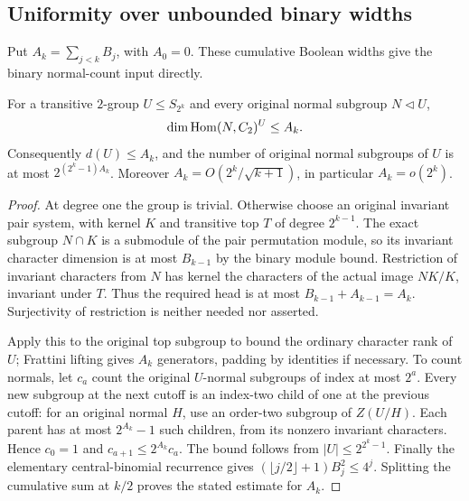 \subsection{Uniformity over unbounded binary widths}
Put $A_k=\sum_{j<k}B_j$, with $A_0=0$. These cumulative Boolean
widths give the binary normal-count input directly.
\begin{lemma}\label{lem:binary-normal-heads}
For a transitive $2$-group $U\leq S_{2^k}$ and every original
normal subgroup $N\lhd U$,
\[
 \dim\operatorname{Hom}(N,C_2)^U\leq A_k.
\]
Consequently $d(U)\leq A_k$, and the number of original normal
subgroups of $U$ is at most $2^{(2^k-1)A_k}$.
Moreover $A_k=O(2^k/\sqrt{k+1})$, in particular $A_k=o(2^k)$.
\end{lemma}
\begin{proof}
At degree one the group is trivial. Otherwise choose an original
invariant pair system, with kernel $K$ and transitive top $T$ of
degree $2^{k-1}$. The exact subgroup $N\cap K$ is a submodule of
the pair permutation module, so its invariant character dimension
is at most $B_{k-1}$ by the binary module bound. Restriction of
invariant characters from $N$ has kernel the characters of the
actual image $NK/K$, invariant under $T$. Thus the required head
is at most $B_{k-1}+A_{k-1}=A_k$. Surjectivity of restriction is
neither needed nor asserted.

Apply this to the original top subgroup to bound the ordinary
character rank of $U$; Frattini lifting gives $A_k$ generators,
padding by identities if necessary. To count normals, let $c_a$
count the original $U$-normal subgroups of index at most $2^a$.
Every new subgroup at the next cutoff is an index-two child of
one at the previous cutoff: for an original normal $H$, use an
order-two subgroup of $Z(U/H)$. Each parent has at
most $2^{A_k}-1$ such children, from its nonzero invariant
characters. Hence $c_0=1$ and $c_{a+1}\leq2^{A_k}c_a$.
The bound follows from $|U|\leq2^{2^k-1}$.
Finally the elementary central-binomial recurrence gives
$(\lfloor j/2\rfloor+1)B_j^2\leq4^j$. Splitting the cumulative
sum at $k/2$ proves the stated estimate for $A_k$.
\end{proof}

